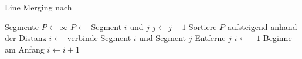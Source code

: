 \begin{algorithm}[ht]
\caption{Line Merging nach \citeauthor{hirzer08}}
\label{alg:linemerging-hirzer}
\begin{algorithmic}[1]
	\Require Segmente
	\State $P \gets \infty$
						\State $P \gets$ Segment $i$ und $j$
					\EndIf
				\EndIf
			\EndIf
			\State $j \gets j + 1$
		\EndFor
		\State Sortiere $P$ aufsteigend anhand der Distanz
			\State $i \gets$ verbinde Segment $i$ und Segment $j$
			\State Entferne $j$
			\State $i \gets -1$
			\Comment Beginne am Anfang
		\EndFor
		\State $i \gets i + 1$
	\EndFor
\end{algorithmic}
\end{algorithm}
